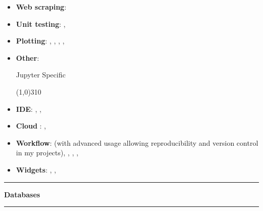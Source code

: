 \documentclass[a4paper,11pt]{article} %
\newcommand{\myhref}[3][blue]{\href{#2}{\color{#1}{#3}}}%
\newcommand{\titre}[1]{%
	\begin{center}
	\rule{\textwidth}{1pt}
	\par\vspace{0.1cm}
        \textbf{\large #1}
	\par\rule{\textwidth}{1pt}
	\end{center}
	}
\begin{document}
\begin{itemize}
\item \textbf{Web scraping}:  \myhref[black-gray]{https://www.crummy.com/software/BeautifulSoup/}{Beautiful Soup}
\item  \textbf{Unit testing}: \myhref[black-gray]{https://docs.pytest.org/}{Pytest},  \myhref[black-gray]{https://nose.readthedocs.io/en/latest/}{Nose}
\item  \textbf{Plotting}: \myhref[black-gray]{https://matplotlib.org}{Matplotlib},  \myhref[black-gray]{https://seaborn.pydata.org}{Seaborn}, \myhref[black-gray]{https://bokeh.pydata.org/en/latest/}{Bokeh},  \myhref[black-gray]{https://plot.ly/python/}{Plotly},  
\myhref[black-gray]{https://altair-viz.github.io}{Altair}
\item  \textbf{Other}: \myhref[black-gray]{https://github.com/ambv/black}{Black}
 \vspace{0.3cm}
 
 
Jupyter Specific
 \vspace{-0.7cm}
 \begin{flushleft}
\line(1,0){310}
\end{flushleft}
 \vspace{-0.6cm}
 \item \textbf{IDE}: \myhref[black-gray]{https://jupyter.org}{Jupyter Notebook}, \myhref[black-gray]{https://jupyter.org}{Jupyter Lab}, \myhref[black-gray]{https://nteract.io}{nteract}
  \item \textbf{Cloud }: \myhref[black-gray]{https://mybinder.org}{Binder}, \myhref[black-gray]{https://colab.research.google.com/}{Google Colab}
  \item \textbf{Workflow}: \myhref[black-gray]{https://nbconvert.readthedocs.io/en/latest/index.html}{nbconvert} (with advanced usage allowing  reproducibility  and version control in my projects), \myhref[black-gray]{https://github.com/jupyter/nbdime}{nbdime}, \myhref[black-gray]{https://github.com/mwouts/jupytext}{Jupytext}, \myhref[black-gray]{https://www.reviewnb.com/}{ReviewNB}, \myhref[black-gray]{https://github.com/ReviewNB/treon}{Treon}

  \item \textbf{Widgets}: \myhref[black-gray]{http://beakerx.com}{BeakerX}, \myhref[black-gray]{https://jupyter-contrib-nbextensions.readthedocs.io/en/latest/}{jupyter\_contrib\_nbextensions} , \myhref[black-gray]{https://github.com/jupyter-widgets/ipywidgets}{ipywidgets}
 
\end{itemize}

\titre{Databases}
\end{document}
